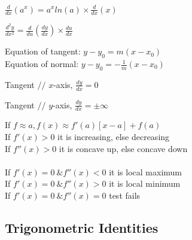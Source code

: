 \documentclass[a4paper,twoside,notitlepage,10pt]{article}
\begin{document}
\begin{landscape}
\begin{multicols}{3}
$\frac{d}{dx}(a^x) = a^{x}ln(a) \times \frac{d}{dx}(x)$

$\frac{d^2y}{dx^2} = \frac{d}{du}(\frac{dy}{dx}) \times \frac{du}{dx}$

Equation of tangent: $y-y_0 = m(x-x_0)$\\
Equation of normal: $y-y_0 = -\frac{1}{m}(x-x_0)$



Tangent $//$ $x$-axis, $\frac{dy}{dx} = 0$


Tangent $//$ $y$-axis, $\frac{dy}{dx} = \pm\infty$

If $f \approx a, f(x) \approx f'(a)[x-a] + f(a)$\\
If $f'(x) > 0$ it is increasing, else decreasing\\
If $f''(x) > 0$ it is concave up, else concave down\\\\
If $f'(x) = 0 \ \& f''(x) < 0$ it is local maximum\\
If $f'(x) = 0 \ \& f''(x) > 0$ it is local minimum\\
If $f'(x) = 0 \ \& f''(x) = 0$ test fails\\


\subsection{Trigonometric Identities}


\end{multicols}
\end{landscape}
\end{document}
